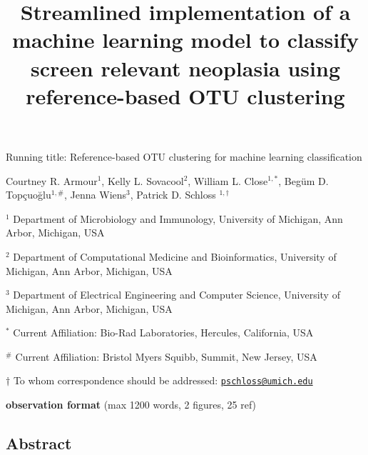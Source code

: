 \documentclass[
]{article}
\title{\textbf{Streamlined implementation of a machine learning model to
classify screen relevant neoplasia using reference-based OTU
clustering}}
\author{}
\date{\vspace{-2.5em}}
\begin{document}
\maketitle

\vspace{5mm}

Running title: Reference-based OTU clustering for machine learning
classification

\vspace{10mm}

Courtney R. Armour\({^1}\), Kelly L. Sovacool\({^2}\), William L.
Close\(^{1,*}\), Begüm D. Topçuoğlu\(^{1,\#}\), Jenna Wiens\({^3}\),
Patrick D. Schloss \(^{1,\dagger}\)

\vspace{10mm}

\({^1}\) Department of Microbiology and Immunology, University of
Michigan, Ann Arbor, Michigan, USA

\({^2}\) Department of Computational Medicine and Bioinformatics,
University of Michigan, Ann Arbor, Michigan, USA

\({^3}\) Department of Electrical Engineering and Computer Science,
University of Michigan, Ann Arbor, Michigan, USA

\({^*}\) Current Affiliation: Bio-Rad Laboratories, Hercules,
California, USA

\({^\#}\) Current Affiliation: Bristol Myers Squibb, Summit, New Jersey,
USA

\(\dagger\) To whom correspondence should be addressed:
\href{mailto:pschloss@umich.edu}{\nolinkurl{pschloss@umich.edu}}

\vspace{10mm}

\textbf{observation format} (max 1200 words, 2 figures, 25 ref)

\newpage

\linenumbers

\hypertarget{abstract}{%
\subsection{Abstract}\label{abstract}}
\end{document}
